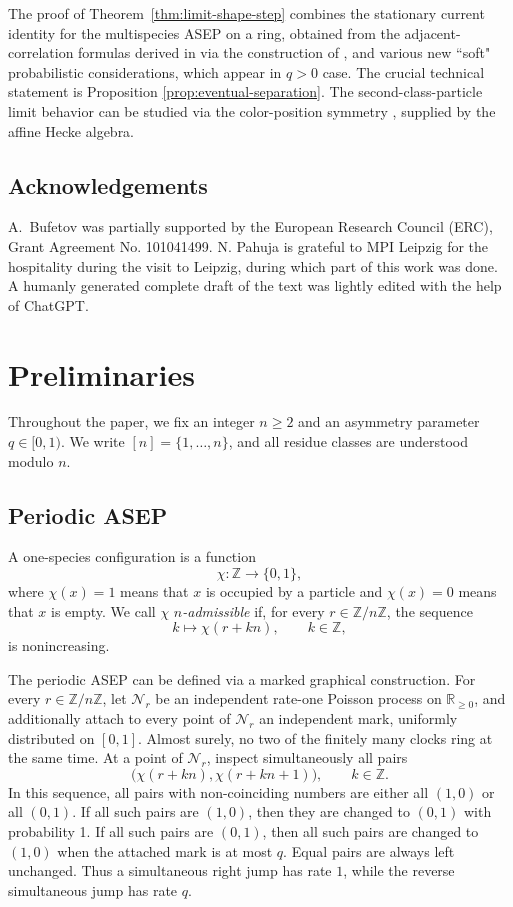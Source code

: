 \documentclass[11pt,a4paper]{amsart}
\theoremstyle{definition}
\theoremstyle{remark}
\numberwithin{equation}{section}
\newcommand{\Z}{\mathbb Z}
\begin{document}
	
	
	The proof of Theorem~\ref{thm:limit-shape-step} combines the stationary
	current identity for the multispecies ASEP on a ring, obtained from the
	adjacent-correlation formulas derived in \cite{PahujaCorrelations} via the construction of \cite{MartinASEP}, and various new ``soft" probabilistic considerations, which appear in $q>0$ case. The crucial technical statement is Proposition \ref{prop:eventual-separation}. 
	The second-class-particle limit behavior can be studied via the color-position
	symmetry \cite{BorodinBufetovColorPosition,BufetovHecke}, supplied by the affine Hecke algebra. 
	
	\subsection*{Acknowledgements}
	A.~Bufetov was partially supported by the European Research Council (ERC), Grant Agreement No. 101041499. N. Pahuja is grateful to MPI Leipzig for the hospitality during the visit to Leipzig, during which part of this work was done. A humanly generated complete draft of the text was lightly edited with the help of ChatGPT. 
	
	\section{Preliminaries}\label{sec:preliminaries}
	
	Throughout the paper, we fix an integer $n\ge 2$ and an asymmetry parameter
	$q\in[0,1)$.  We write $[n]=\{1,\ldots,n\}$, and all residue classes are
	understood modulo $n$.
	
	\subsection{Periodic ASEP}\label{subsec:periodic-asep}
	
	A one-species configuration is a function
	\[
	\chi:\Z\longrightarrow\{0,1\},
	\]
	where $\chi(x)=1$ means that $x$ is occupied by a particle and $\chi(x)=0$ means that $x$
	is empty.  We call $\chi$ \emph{$n$-admissible} if, for every $r\in\Z/n\Z$,
	the sequence
	\[
	k\longmapsto \chi(r+kn),\qquad k\in\Z,
	\]
	is nonincreasing.
	
	The periodic ASEP can be defined via a marked graphical
	construction.  For every $r\in\Z/n\Z$, let $\mathcal N_r$ be an independent
	rate-one Poisson process on $\mathbb{R}_{\ge 0}$, and additionally attach to every point of $\mathcal N_r$ an
	independent mark, uniformly distributed on $[0,1]$.  Almost surely, no two of
	the finitely many clocks ring at the same time.  At a point of
	$\mathcal N_r$, inspect simultaneously all pairs
	\[
	\bigl(\chi(r+kn),\chi(r+kn+1)\bigr),\qquad k\in\Z.
	\]
	In this sequence, all pairs with non-coinciding numbers are either all $(1,0)$ or all $(0,1)$. If all such pairs are $(1,0)$, then they are changed to $(0,1)$ with probability 1. If all such pairs are $(0,1)$, then all such pairs are changed to $(1,0)$ when the attached
	mark is at most $q$.  Equal pairs are always left unchanged. Thus a simultaneous right jump has rate $1$,
	while the reverse simultaneous jump has rate $q$.
	
\end{document}
